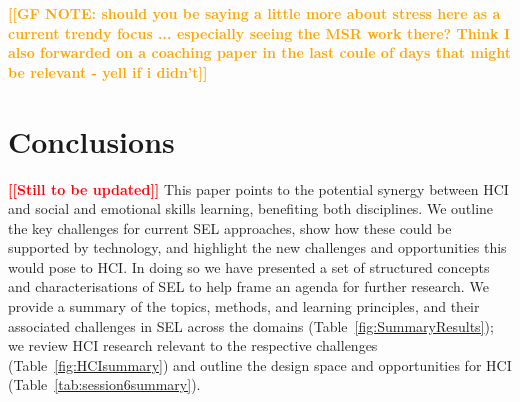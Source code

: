 \documentclass[prodmode,acmtochi]{acmsmall}
\newcommand{\Geraldine}[1]{\textrm{\textbf{\textcolor{Orange}{[[#1]]}}}}
\newcommand{\GeraldineTODO}[1]{}
\newcommand{\TODO}[1]{\textrm{\textbf{\textcolor{Red}{[[#1]]}}}}
\begin{document}
\Geraldine{GF NOTE: should you be saying a little more about stress here as a current trendy focus ... especially seeing the MSR work there? Think I also forwarded on a coaching paper in the last coule of days that might be relevant - yell if i didn't}

\GeraldineTODO{G: (G: add a little more on life coaching since a growing area? example refs in comments - chapter mentions some reviews but says more needed of course  P: I have a psychology of coaching book at home -- I will have a look if anything can be pulled out from there)  P: Plus read the Green2006 paper in more detail}
 







\section{Conclusions}
\label{sec:conclusion}

\TODO{Still to be updated}
This paper points to the potential synergy between HCI and social and emotional skills learning, benefiting both disciplines.
%
We outline the key challenges for current SEL approaches, show how these could be supported by technology, and highlight the new challenges and opportunities this would pose to HCI.
%
In doing so we have presented a set of structured concepts and characterisations of SEL to help frame an agenda for further research. We provide a summary of the topics, methods, and learning principles, and their associated challenges in SEL across the domains (Table~\ref{fig:SummaryResults}); we review HCI research relevant to the respective challenges (Table~\ref{fig:HCIsummary}) and outline the design space and opportunities for HCI  (Table~\ref{tab:session6summary}).
\end{document}
